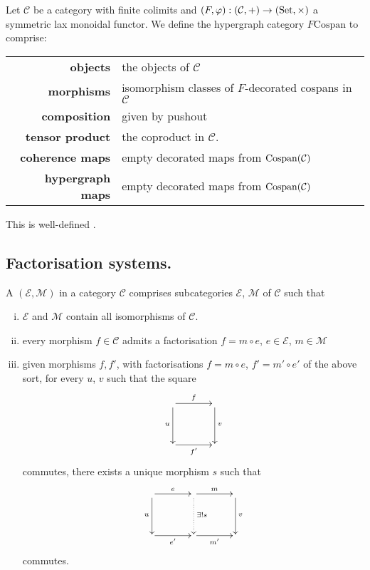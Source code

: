 \begin{definition} \label{thm:fcospanss}
  Let $\mathcal C$ be a category with finite colimits and $(F,\varphi):
  (\mathcal C,+) \to (\mathrm{Set}, \times)$ a symmetric lax monoidal functor. We define
  the hypergraph category $F\mathrm{Cospan}$ to comprise:

  \begin{tabular}{ r p{}}
    \textbf{objects} & the objects of $\mathcal C$ \\ 
    \textbf{morphisms} & isomorphism classes of $F$-decorated cospans in
    $\mathcal C$\\ 
  \textbf{composition} & given by pushout \\
  \textbf{tensor product} & the coproduct in $\mathcal C$. \\
  \textbf{coherence maps} & empty decorated maps from $\operatorname{{Cospan}}(\mathcal C)$ \\
  \textbf{hypergraph maps} & empty decorated maps from $\operatorname{{Cospan}}(\mathcal C)$
  \end{tabular}
\end{definition}

This is well-defined \cite{F}.

\subsection{Factorisation systems.}

\begin{definition}
  A  $(\mathcal E,\mathcal M)$ in a category $\mathcal C$
  comprises subcategories $\mathcal E$, $\mathcal M$ of $\mathcal C$ such that
  \begin{enumerate}[(i)]
    \item $\mathcal E$ and $\mathcal M$ contain all isomorphisms of $\mathcal
      C$.
    \item  every morphism $f \in \mathcal C$ admits a factorisation $f=m \circ e$, $e \in
  \mathcal E$, $m \in \mathcal M$
\item given morphisms $f,f'$, with factorisations $f = m \circ e$, $f' = m' \circ
  e'$ of the above sort, for every $u$, $v$ such that the square
  \[
    \xymatrixcolsep{3pc}
    \xymatrixrowsep{3pc}
    \xymatrix{
       \ar[r]^f \ar[d]_u &  \ar[d]^v \\
       \ar[r]_{f'} & 
    }
  \]
  commutes, there exists a unique morphism $s$ such that
  \[
    \xymatrixcolsep{3pc}
    \xymatrixrowsep{3pc}
    \xymatrix{
      \ar[r]^e \ar[d]_u & \ar[r]^m \ar@{.>}[d]^{\exists! s} &  \ar[d]^v \\
       \ar[r]_{e'}& \ar[r]_{m'} & 
    }
  \]
  commutes.
  \end{enumerate}
\end{definition}

